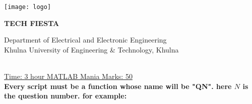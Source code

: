\documentclass[11pt,paper=a4,answers]{exam}
\begin{document}

\noindent
\begin{minipage}[l]{.1\textwidth}%
\noindent
\texttt{[image: logo]}
\end{minipage}
\hfill
\begin{minipage}[r]{.75\textwidth}%
\begin{center}
{\Large \bfseries TECH FIESTA \par
\large Department of Electrical and Electronic Engineering \\[2pt]
\large {Khulna University of Engineering \& Technology, Khulna} \\[2pt] \par}
  \vspace{0.5cm}
\end{center}
\end{minipage}
\par
\noindent
\\
\uline{Time: 3 hour   \hfill MATLAB Mania \hfill        Marks: 50}\\
\lstset{language=Octave, frame = shadowbox}
\textbf{Every script must be a function whose name will be "QN". here $N$ is the question number. for example:}
\end{document}
